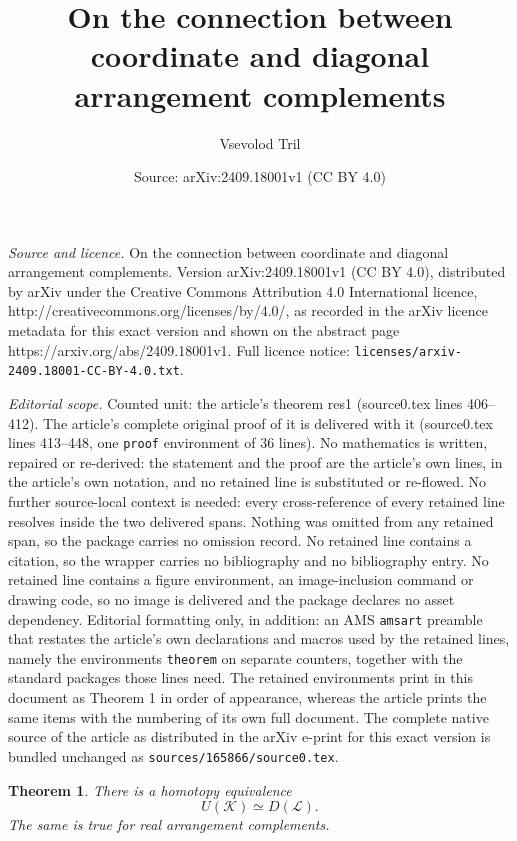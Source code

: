 \documentclass[10pt,a4paper]{amsart}
\title{On the connection between coordinate and diagonal arrangement complements}
\author{Vsevolod Tril}
\date{Source: arXiv:2409.18001v1 (CC BY 4.0)}
\newtheorem{theorem}{Theorem}
\newcommand{\K}{\mathcal K}
\begin{document}
\maketitle

\noindent\emph{Source and licence.} On the connection between coordinate and diagonal arrangement complements. Version arXiv:2409.18001v1 (CC BY 4.0), distributed by arXiv under the Creative Commons Attribution 4.0 International licence, http://creativecommons.org/licenses/by/4.0/, as recorded in the arXiv licence metadata for this exact version and shown on the abstract page https://arxiv.org/abs/2409.18001v1. Full licence notice: \texttt{licenses/arxiv-2409.18001-CC-BY-4.0.txt}.\par\smallskip

\noindent\textit{Editorial scope.} Counted unit: the article's theorem res1 (source0.tex lines 406--412). The article's complete original proof of it is delivered with it (source0.tex lines 413--448, one \texttt{proof} environment of 36 lines). No mathematics is written, repaired or re-derived: the statement and the proof are the article's own lines, in the article's own notation, and no retained line is substituted or re-flowed.  No further source-local context is needed: every cross-reference of every retained line resolves inside the two delivered spans.  Nothing was omitted from any retained span, so the package carries no omission record.  No retained line contains a citation, so the wrapper carries no bibliography and no bibliography entry.  No retained line contains a figure environment, an image-inclusion command or drawing code, so no image is delivered and the package declares no asset dependency.  Editorial formatting only, in addition: an AMS \texttt{amsart} preamble that restates the article's own declarations and macros used by the retained lines, namely the environments \texttt{theorem} on separate counters, together with the standard packages those lines need.  The retained environments print in this document as Theorem 1 in order of appearance, whereas the article prints the same items with the numbering of its own full document.  The complete native source of the article as distributed in the arXiv e-print for this exact version is bundled unchanged as \texttt{sources/165866/source0.tex}.
\begin{theorem}\label{res1}
There is a homotopy equivalence
	$$U(\K) \simeq D(\mathcal{L}).$$
The same is true for real arrangement complements.
\end{theorem}
\end{document}
